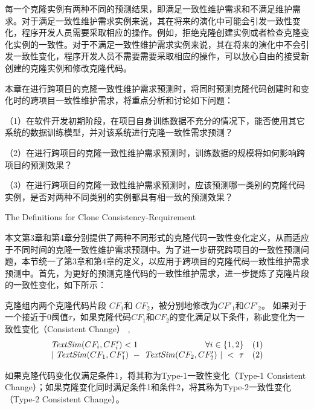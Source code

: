 每一个克隆实例有两种不同的预测结果，即满足一致性维护需求和不满足维护需求。对于满足一致性维护需求实例来说，其在将来的演化中可能会引发一致性变化，程序开发人员需要采取相应的操作。例如，拒绝克隆创建实例或者检查克隆变化实例的一致性。对于不满足一致性维护需求实例来说，其在将来的演化中不会引发一致性变化，程序开发人员不需要需要采取相应的操作，可以放心自由的接受新创建的克隆实例和修改克隆代码。

本章在进行跨项目的克隆一致性维护需求预测时，将同时预测克隆代码创建时和变化时的跨项目一致性维护需求，将重点分析和讨论如下问题：

（1）在软件开发初期阶段，在项目自身训练数据不充分的情况下，能否使用其它系统的数据训练模型，并对该系统进行克隆一致性需求预测？

（2）在进行跨项目的克隆一致性维护需求预测时，训练数据的规模将如何影响跨项目的预测效果？%

（3）在进行跨项目的克隆一致性维护需求预测时，应该预测哪一类别的克隆代码实例，是否对两种不同类别的实例都具有相一致的预测效果？

{The Definitions for Clone Consistency-Requirement}

本文第3章和第4章分别提供了两种不同形式的克隆代码一致性变化定义，从而适应于不同时间的克隆一致性维护需求预测中。为了进一步研究跨项目的一致性预测问题，本节统一了第3章和第4章的定义，以应用于跨项目的克隆代码一致性维护需求预测中。首先，为更好的预测克隆代码的一致性维护需求，进一步提炼了克隆片段的一致性变化，如下所示：

\begin{definition}[克隆片段的一致性变化]  
\label{def-change}
克隆组内两个克隆代码片段 $CF_1$和 $CF_2$，被分别地修改为$CF'_1$和$CF'_2$。 如果对于一个接近于0阈值$\tau$，如果克隆代码$CF_1$和$CF_2$的变化满足以下条件，称此变化为一致性变化（Consistent Change） , 
\begin{equation}
\begin{split}
\begin{array}[t]{crl}
 \mathit{TextSim}(CF_i, CF'_i) < 1 & \forall i \in \{1,2\} &(1) \\
 \multicolumn{2}{c}{| ~\mathit{TextSim}(CF_1,CF'_1)  ~-~ \mathit{TextSim}(CF_2,CF'_2) ~| ~< ~ \tau}  & (2)
\end{array}
\end{split}
\end{equation}

如果克隆代码变化仅满足条件1，将其称为Type-1一致性变化（Type-1 Consistent Change）；如果克隆变化同时满足条件1和条件2，将其称为Type-2一致性变化（Type-2 Consistent Change）。
\end{definition}

